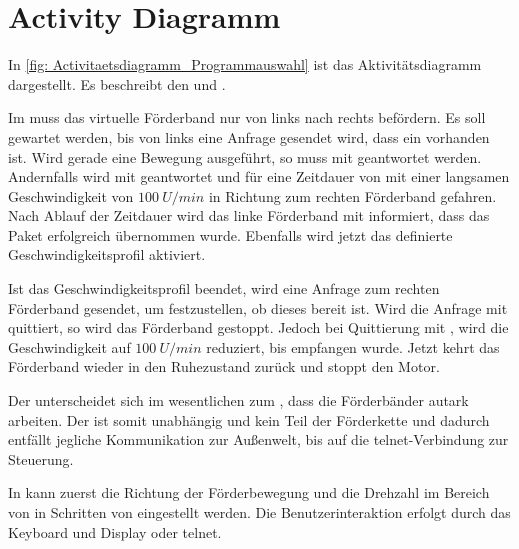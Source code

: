 \documentclass[./\jobname.tex]{subfiles}
\begin{document}
\section{Activity Diagramm}
%
In \autoref{fig: Activitaetsdiagramm_Programmauswahl} ist das Aktivitätsdiagramm dargestellt. Es beschreibt den \modeA und \modeB.\par
%
Im \modeB muss das virtuelle Förderband nur  von links nach rechts befördern. Es soll gewartet werden, bis von links eine Anfrage gesendet wird, dass ein \paket{} vorhanden ist. Wird gerade eine Bewegung ausgeführt, so muss mit \wait geantwortet werden. Andernfalls wird mit \ready geantwortet und für eine Zeitdauer von \timeTpp mit einer langsamen Geschwindigkeit von \(100~U/min\) in Richtung zum rechten Förderband gefahren. Nach Ablauf der Zeitdauer \tpp wird das linke Förderband mit \release informiert, dass das Paket erfolgreich übernommen wurde. Ebenfalls wird jetzt das definierte Geschwindigkeitsprofil aktiviert.\par
Ist das Geschwindigkeitsprofil beendet, wird eine \request Anfrage zum rechten Förderband gesendet, um festzustellen, ob dieses bereit ist. Wird die Anfrage mit \wait quittiert, so wird das Förderband gestoppt. Jedoch bei Quittierung mit \ready, wird die Geschwindigkeit auf \(100~U/min\) reduziert, bis \release empfangen wurde. Jetzt kehrt das Förderband wieder in den Ruhezustand zurück und stoppt den Motor.\par
%
Der \modeA unterscheidet sich im wesentlichen zum \modeB, dass die Förderbänder autark arbeiten. Der \modeA ist somit unabhängig und kein Teil der Förderkette und dadurch entfällt jegliche Kommunikation zur Außenwelt, bis auf die \gls{telnet}-Verbindung zur Steuerung.\par
%
In \modeA kann zuerst die Richtung der Förderbewegung und die Drehzahl im Bereich von \minMaxVelocity in Schritten von \stepSizeMotor eingestellt werden. Die Benutzerinteraktion erfolgt durch das Keyboard und Display oder \gls{telnet}.
%
\end{document}
